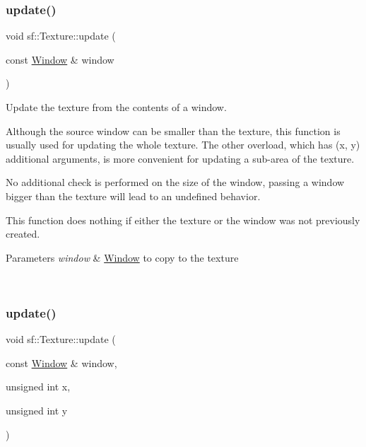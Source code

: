 \subsubsection{\texorpdfstring{update()}{update()}\hspace{0.1cm}{\footnotesize\ttfamily [7/8]}}
{\footnotesize\ttfamily void sf\+::\+Texture\+::update (\begin{DoxyParamCaption}\item[{const \mbox{\hyperlink{classsf_1_1_window}{Window}} \&}]{window }\end{DoxyParamCaption})}



Update the texture from the contents of a window. 

Although the source window can be smaller than the texture, this function is usually used for updating the whole texture. The other overload, which has (x, y) additional arguments, is more convenient for updating a sub-\/area of the texture.

No additional check is performed on the size of the window, passing a window bigger than the texture will lead to an undefined behavior.

This function does nothing if either the texture or the window was not previously created.


\begin{DoxyParams}{Parameters}
{\em window} & \mbox{\hyperlink{classsf_1_1_window}{Window}} to copy to the texture \begin{DoxyVerb}\end{DoxyVerb}
 \\
\hline
\end{DoxyParams}
\mbox{\label{classsf_1_1_texture_a154f246eb8059b602076009ab1cfd175}} 
\subsubsection{\texorpdfstring{update()}{update()}\hspace{0.1cm}{\footnotesize\ttfamily [8/8]}}
{\footnotesize\ttfamily void sf\+::\+Texture\+::update (\begin{DoxyParamCaption}\item[{const \mbox{\hyperlink{classsf_1_1_window}{Window}} \&}]{window,  }\item[{unsigned int}]{x,  }\item[{unsigned int}]{y }\end{DoxyParamCaption})}



